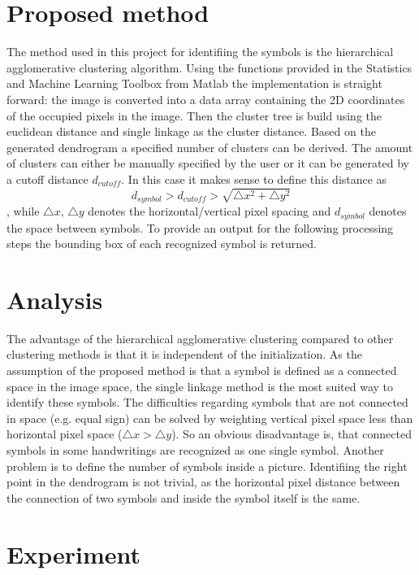 \documentclass[twocolumn]{article}%
\begin{document}
	\section{Proposed method}
		The method used in this project for identifiing the symbols is the hierarchical agglomerative clustering algorithm. Using the functions provided in the Statistics and Machine Learning Toolbox from Matlab \cite{sml_matlab} the implementation is straight forward: the image is converted into a data array containing the 2D coordinates of the occupied pixels in the image. Then the cluster tree is build using the euclidean distance and single linkage as the cluster distance. Based on the generated dendrogram a specified number of clusters can be derived. The amount of clusters can either be manually specified by the user or it can be generated by a cutoff distance $d_{cutoff}$. In this case it makes sense to define this distance as
		\begin{equation}
		d_{symbol} > d_{cutoff} > \sqrt{\triangle x^2 + \triangle y^2}
		\end{equation}
		, while $\triangle x$, $\triangle y$ denotes the horizontal/vertical pixel spacing and $d_{symbol}$ denotes the space between symbols. To provide an output for the following processing steps the bounding box of each recognized symbol is returned.
		
	
	\section{Analysis}
		The advantage of the hierarchical agglomerative clustering compared to other clustering methods is that it is independent of the initialization. As the assumption of the proposed method is that a symbol is defined as a connected space in the image space, the single linkage method is the most suited way to identify these symbols. The difficulties regarding symbols that are not connected in space (e.g. equal sign) can be solved by weighting vertical pixel space less than horizontal pixel space ($\triangle x > \triangle y$). 
		So an obvious disadvantage is, that connected symbols in some handwritings are recognized as one single symbol. Another problem is to define the number of symbols inside a picture. Identifiing the right point in the dendrogram is not trivial, as the horizontal pixel distance between the connection of two symbols and inside the symbol itself is the same.
	
	\section{Experiment}
		
\end{document}
